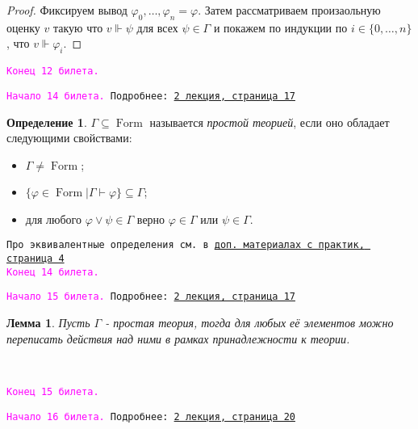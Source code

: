 \documentclass[a4paper,100pt]{article}
\theoremstyle{indented}
\newtheorem{lemma}{Лемма}
\theoremstyle{definition}
\newtheorem{defn}{Определение}
\theoremstyle{remark}
\DeclareMathOperator{\form}{Form}
\begin{document}
\begin{proof}
  Фиксируем вывод $\varphi_0, \ldots, \varphi_n = \varphi$. Затем рассматриваем произаольную оценку $v$ такую что $v\Vdash \psi$ для всех $\psi \in \Gamma$ и покажем по индукции по $i\in\{0, \ldots, n\}$, что $v\Vdash \varphi_i$.
\end{proof}

\texttt{\textcolor{magenta}{Конец 12 билета.}} 

\hrulefill

\texttt{\hypertarget{b14}{\textcolor{magenta}{Начало 14 билета.}} Подробнее: \href{http://www.mi-ras.ru/~speranski/courses/logic-1-2021-spring/slides_2.pdf}{2 лекция, страница 17}} 

\begin{defn}
  $\Gamma \subseteq \form$ называется \textit{простой теорией}, если оно обладает следующими свойствами:

  \begin{itemize}
    \item $\Gamma \neq \form$; 
    \item $\{\varphi \in \form |\Gamma \vdash \varphi\}\subseteq \Gamma$; 
    \item для любого $\varphi \vee \psi \in \Gamma$ верно $\varphi \in \Gamma$ или $\psi \in \Gamma$. 
  \end{itemize}
\end{defn}

\texttt{Про эквивалентные определения см. в \href{http://www.mi-ras.ru/~speranski/courses/logic-1-2021-spring/slides-more_pcl.pdf}{доп. материалах с практик, страница 4}} \\ 

\texttt{\textcolor{magenta}{Конец 14 билета.}} 

\hrulefill

\texttt{\hypertarget{b15}{\textcolor{magenta}{Начало 15 билета.}} Подробнее: \href{http://www.mi-ras.ru/~speranski/courses/logic-1-2021-spring/slides_2.pdf}{2 лекция, страница 17}} \\

\begin{lemma}
  Пусть $\Gamma$ - простая теория, тогда для любых её элементов можно переписать действия над ними в рамках принадлежности к теории.
\end{lemma}\

\texttt{\textcolor{magenta}{Конец 15 билета.}} 

\hrulefill

\texttt{\hypertarget{b16}{\textcolor{magenta}{Начало 16 билета.}} Подробнее: \href{http://www.mi-ras.ru/~speranski/courses/logic-1-2021-spring/slides_2.pdf}{2 лекция, страница 20}} \\
\end{document}
